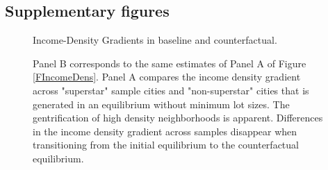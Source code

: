 \documentclass[12pt]{article}
\begin{document}
	\clearpage
	
	\subsection{Supplementary figures}\label{Appendix:CounterfactualSupplmentaryFigures}
		\begin{figure}[htbp!]
		
		\caption{Income-Density Gradients in baseline and counterfactual.}\label{figure:gentrification_alternate}
		
		\caption*{Panel B corresponds to the same estimates of Panel A of Figure \ref{FIncomeDens}. Panel A compares the income density gradient across "superstar" sample cities and "non-superstar" cities that is generated in an equilibrium without minimum lot sizes. The gentrification of high density neighborhoods is apparent. Differences in the income density gradient across samples disappear when transitioning from the initial equilibrium to the counterfactual equilibrium.}
		
	\end{figure}
	
	
	
\end{document}
